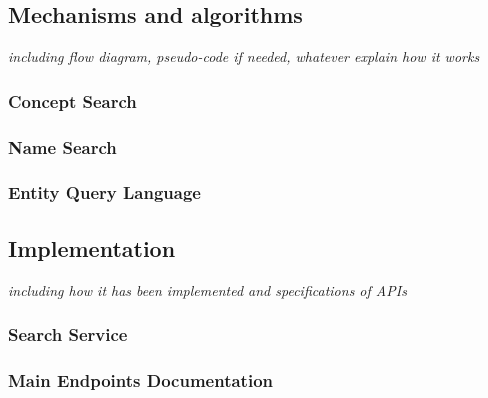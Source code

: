 
\subsection{Mechanisms and algorithms}
{\it including flow diagram, pseudo-code if needed, whatever explain how it works}


\subsubsection{Concept Search}

\subsubsection{Name Search}

\subsubsection{Entity Query Language}

\subsection{Implementation}
{\it including how it has been implemented and specifications of APIs}

\subsubsection{Search Service}

\subsubsection{Main Endpoints Documentation}